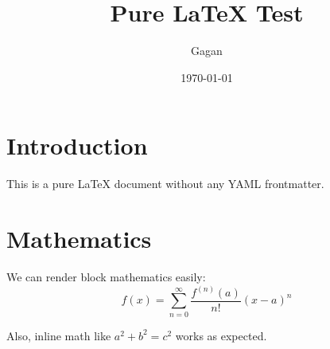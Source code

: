 \documentclass{article}
\title{Pure LaTeX Test}
\author{Gagan}
\date{\today}
\begin{document}
\maketitle

\section{Introduction}
This is a pure LaTeX document without any YAML frontmatter.

\section{Mathematics}
We can render block mathematics easily:
\begin{equation}
f(x) = \sum_{n=0}^{\infty} \frac{f^{(n)}(a)}{n!} (x-a)^n
\end{equation}

Also, inline math like $a^2 + b^2 = c^2$ works as expected.
\end{document}
